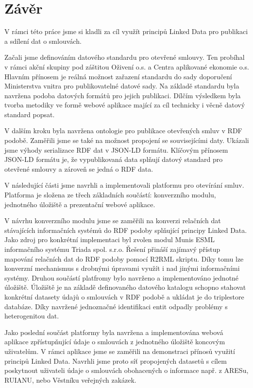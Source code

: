 \chapter*{Závěr}

V rámci této práce jsme si kladli za cíl využít principů Linked Data pro publikaci a sdílení dat o smlouvách. 

Začali jsme definováním datového standardu pro otevřené smlouvy. Ten probíhal v rámci akční skupiny pod záštitou Oživení o.s. a Centra aplikované ekonomie o.s. Hlavním přínosem je reálná možnost zařazení standardu do sady doporučení Ministerstva vnitra pro publikovatelné datové sady. Na základě standardu byla navržena podoba datových formátů pro jejich publikaci. Dílčím výsledkem byla tvorba metodiky ve formě webové aplikace mající za cíl technicky i věcně datový standard popsat. 

V dalším kroku byla navržena ontologie pro publikace otevřených smluv v RDF podobě. Zaměřili jsme se také na možnost propojení se souvisejícími daty. Ukázali jsme výhody serializace RDF dat v JSON-LD formátu. Klíčovým přínosem JSON-LD formátu je, že vypublikovaná data splňují datový standard pro otevřené smlouvy a zároveň se jedná o RDF data. 

V následující části jsme navrhli a implementovali platformu pro otevírání smluv. Platforma je složena ze třech základních součástí: konverzního modulu, jednotného úložiště a prezentační webové aplikace. 

V návrhu konverzního modulu jsme se zaměřili na konverzi relačních dat stávajících informačních systémů do RDF podoby splňující principy Linked Data. Jako zdroj pro konkrétní implementaci byl zvolen modul Munis ESML informačního systému Triada spol. s.r.o. Řešení přináší zajímavý přístup mapování relačních dat do RDF podoby pomocí R2RML skriptu. Díky tomu lze konverzní mechanismus s drobnými úpravami využít i nad jinými informačními systémy.
Druhou součástí platfromy bylo navrženo a implementováno jednotné úložiště. Úložiště je na základě definovaného datového katalogu schopno stahovat konkrétní datasety údajů o smlouvách v RDF podobě a ukládat je do triplestore databáze. Díky navržené jednoznačné identifikaci entit odpadly problémy s heterogenitou dat. 

Jako poslední součást platformy byla navržena a implementována webová aplikace zpřístupňující údaje o smlouvách z jednotného úložiště koncovým uživatelům. V rámci aplikace jsme se zaměřili na demonstraci přínosů využití principů Linked Data. Navrhli jsme proto síť propojených datasetů s cílem poskytnout uživateli údaje o smlouvách obohacených o informace např. z ARESu, RUIANU, nebo Věstníku veřejných zakázek.

